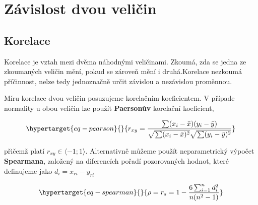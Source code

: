 \documentclass[
  letterpaper,
  DIV=11,
  numbers=noendperiod]{scrreprt}
\begin{document}

\hypertarget{seq-zavislost}{%
\chapter{Závislost dvou veličin}\label{seq-zavislost}}

\hypertarget{sec-korelace}{%
\section{Korelace}\label{sec-korelace}}

Korelace je vztah mezi dvěma náhodnými veličinami. Zkoumá, zda se jedna
ze zkoumaných veličin mění, pokud se zároveň mění i druhá.Korelace
nezkoumá příčinnost, nelze tedy jednoznačně určit závislou a nezávislou
proměnnou.

Míru korelace dvou veličin posuzujeme korelačním koeficientem. V případe
normality u obou veličin lze použít \textbf{Paersonův} korelační
koeficient,

\begin{equation}\protect\hypertarget{eq-pearson}{}{
r_{xy} = \dfrac{\sum(x_i - \bar{x})(y_i - \bar{y})}{\sqrt{\sum(x_i - \bar{x})^2}\sqrt{\sum(y_i - \bar{y})^2}}
}\label{eq-pearson}\end{equation}

přičemž platí \(r_{xy}\in\langle-1;1\rangle\). Alternativně můžeme
použít neparametrický výpočet \textbf{Spearmana}, založený na
diferencích pořadí pozorovaných hodnot, které definujeme jako
\(d_i = x_{ri} - y_{ri}\)

\begin{equation}\protect\hypertarget{eq-spearman}{}{
\rho = r_s = 1 - \dfrac{6\sum_{i=1}^{n}d_i^2}{n(n^2-1)} 
}\label{eq-spearman}\end{equation}
\end{document}
